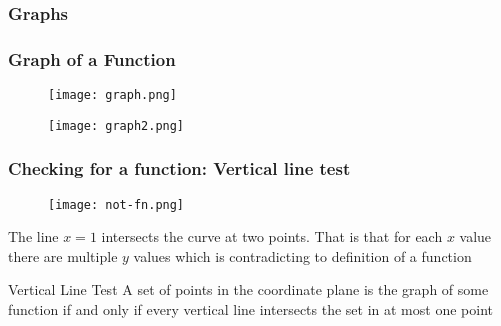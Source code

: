 \subsubsection{Graphs}
\begin{frame}
  \frametitle{Graph of a Function}
  \begin{figure}[h]    
    \centering
    \texttt{[image: graph.png]}
\end{figure}
\begin{figure}[h]    
  \centering
  \texttt{[image: graph2.png]}
\end{figure}
\end{frame}

\begin{frame}
  \frametitle{Checking for a function: Vertical line test}
  \begin{figure}[h]    
  \centering
  \texttt{[image: not-fn.png]}
  \end{figure}
  \pause
  The line  \(x=1\) intersects the curve at two points. That is that for each \(x\) value there are multiple \(y\) values which is contradicting to definition of a function 
  \begin{block}{Vertical Line Test}
    A set of points in the coordinate plane is the graph of some function if and only if every vertical line intersects the set in at most one point 
  \end{block}
\end{frame} 
